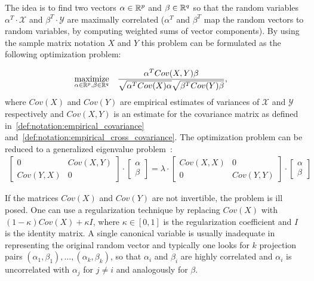The idea is to find two vectors $\alpha \in \mathbb{R}^p$ and $\beta \in \mathbb{R}^q$ so that the random variables
$\alpha^T \cdot \mathcal{X}$ and $\beta^T \cdot \mathcal{Y}$ are maximally correlated
($\alpha^T$ and $\beta^T$ map the random vectors to random variables, by computing weighted
sums of vector components). By using the sample matrix notation $X$ and $Y$ this problem can
be formulated as the following optimization problem:

\begin{equation}\label{eq:background:cca:original}
\begin{aligned}
& \underset{\alpha \in \mathbb{R}^{p}, \beta \in \mathbb{R}^{q}}{\text{maximize}}
& & \frac{\alpha^T Cov(X,Y) \beta}{\sqrt{\alpha^T Cov(X) \alpha} \sqrt{\beta^T Cov(Y) \beta}},
\end{aligned}
\end{equation}
where $Cov(X)$ and $Cov(Y)$ are empirical estimates of variances of $\mathcal{X}$ and $\mathcal{Y}$
respectively and $Cov(X,Y)$ is an estimate for the covariance matrix as defined in~\ref{def:notation:empirical_covariance} and~\ref{def:notation:empirical_cross_covariance}.
 The optimization problem can be reduced to a generalized eigenvalue problem~\cite{HardoonCCA}:
\begin{align}\label{eq:background:cca:eigen}
\begin{bmatrix}
    0       & Cov(X,Y) \\
    Cov(Y,X)& 0
\end{bmatrix}
\cdot
\begin{bmatrix}
    \alpha \\
    \beta
\end{bmatrix}
=
\lambda
\cdot
\begin{bmatrix}
    Cov(X,X) & 0 \\
    0 &  Cov(Y,Y)
\end{bmatrix}
\cdot
\begin{bmatrix}
    \alpha \\
    \beta
\end{bmatrix}
\end{align}

If the matrices $Cov(X)$ and $Cov(Y)$ are not invertible, the problem is ill posed. One can use a regularization technique by replacing $Cov(X)$ with $(1- \kappa)Cov(X) + \kappa I$, where $\kappa \in [0,1]$ is the regularization coefficient and $I$ is the identity matrix.
A single canonical variable is usually inadequate in representing the original random vector and typically one looks for $k$ projection pairs $(\alpha_1, \beta_1),\ldots,(\alpha_k, \beta_k)$, so that $\alpha_i$ and $\beta_i$ are highly correlated and $\alpha_i$ is uncorrelated with $\alpha_j$  for $j \neq i$ and analogously for $\beta$.

